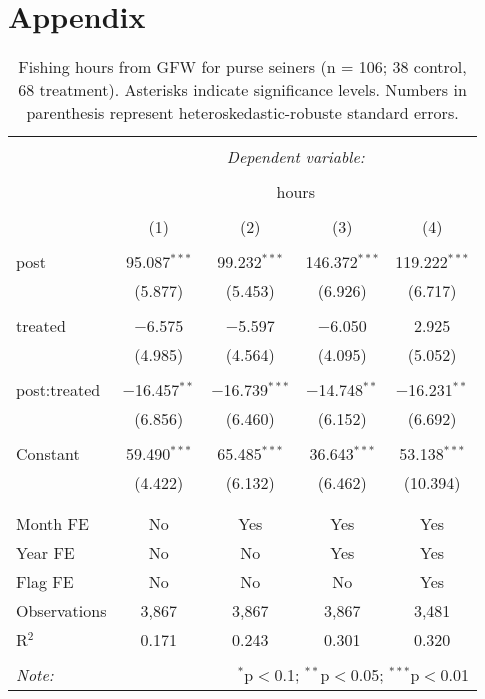 \documentclass[12pt,]{article}
\begin{document}
\clearpage

\section{Appendix}\label{appendix}

\begin{table}[!htbp] \centering 
  \caption{\label{tab:purse_old}Fishing hours from GFW for purse seiners (n = 106; 38 control, 68 treatment). Asterisks indicate significance levels. Numbers in parenthesis represent heteroskedastic-robuste standard errors.} 
  \label{} 
\begin{tabular}{@{\extracolsep{5pt}}lcccc} 
\\[-1.8ex]\hline 
\hline \\[-1.8ex] 
 & \multicolumn{4}{c}{\textit{Dependent variable:}} \\ 
\cline{2-5} 
\\[-1.8ex] & \multicolumn{4}{c}{hours} \\ 
\\[-1.8ex] & (1) & (2) & (3) & (4)\\ 
\hline \\[-1.8ex] 
 post & 95.087$^{***}$ & 99.232$^{***}$ & 146.372$^{***}$ & 119.222$^{***}$ \\ 
  & (5.877) & (5.453) & (6.926) & (6.717) \\ 
  & & & & \\ 
 treated & $-$6.575 & $-$5.597 & $-$6.050 & 2.925 \\ 
  & (4.985) & (4.564) & (4.095) & (5.052) \\ 
  & & & & \\ 
 post:treated & $-$16.457$^{**}$ & $-$16.739$^{***}$ & $-$14.748$^{**}$ & $-$16.231$^{**}$ \\ 
  & (6.856) & (6.460) & (6.152) & (6.692) \\ 
  & & & & \\ 
 Constant & 59.490$^{***}$ & 65.485$^{***}$ & 36.643$^{***}$ & 53.138$^{***}$ \\ 
  & (4.422) & (6.132) & (6.462) & (10.394) \\ 
  & & & & \\ 
\hline \\[-1.8ex] 
Month FE & No & Yes & Yes & Yes \\ 
Year FE & No & No & Yes & Yes \\ 
Flag FE & No & No & No & Yes \\ 
Observations & 3,867 & 3,867 & 3,867 & 3,481 \\ 
R$^{2}$ & 0.171 & 0.243 & 0.301 & 0.320 \\ 
\hline 
\hline \\[-1.8ex] 
\textit{Note:}  & \multicolumn{4}{r}{$^{*}$p$<$0.1; $^{**}$p$<$0.05; $^{***}$p$<$0.01} \\ 
\end{tabular} 
\end{table}
\end{document}
